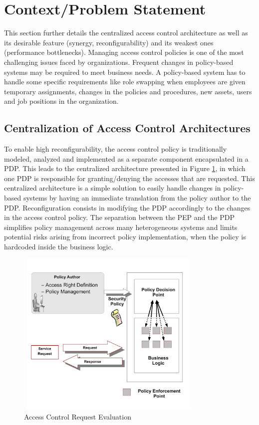 
\section{Context/Problem Statement} \label{sec:context}
This section further details the centralized access control architecture as well as its desirable feature (synergy, reconfigurability) and its weakest ones (performance bottlenecks). 
Managing access control policies is one of the most challenging issues faced by organizations. Frequent changes in policy-based systems may be required to meet business needs. 
A policy-based system has to handle some specific requirements like role swapping when employees are given temporary assignments, changes in the policies and procedures, 
new assets, users and job positions in the organization.

\subsection{Centralization of Access Control Architectures}
To enable high reconfigurability, the access control policy is traditionally modeled, analyzed and implemented as a separate component 
encapsulated in a PDP. This leads to the centralized architecture presented in Figure \ref{pep-pdp}, in which one PDP is responsible for granting/denying the accesses that are requested. 
This centralized architecture is a simple solution to easily handle changes in policy-based systems by having an immediate translation from the policy author to the PDP. Reconfiguration consists in modifying the PDP accordingly to 
the changes in the access control policy. The separation between the PEP and the PDP simplifies policy management across many heterogeneous systems and limits
potential risks arising from incorrect policy implementation, when the policy is hardcoded inside the business logic.

\begin{figure}[!h]
\begin{center}
\includegraphics[width=9cm, height=8cm]{business-logic}
\caption{Access Control Request Evaluation}
\label{pep-pdp}
\end{center}
\end{figure}

